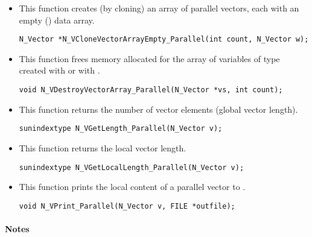 \begin{itemize}

\item {}
 
  This function creates (by cloning) an array of  parallel vectors,
  each with an empty () data array.
 
\begin{verbatim}
N_Vector *N_VCloneVectorArrayEmpty_Parallel(int count, N_Vector w);
\end{verbatim}


\item {}
 
 This function frees memory allocated for the array of   variables of
 type  created with  or with
 .
 

 \verb|void N_VDestroyVectorArray_Parallel(N_Vector *vs, int count);|



\item {}

 This function returns the number of vector elements (global vector length).

 
 
 \verb|sunindextype N_VGetLength_Parallel(N_Vector v);|


\item {}

 This function returns the local vector length.

 
 
 \verb|sunindextype N_VGetLocalLength_Parallel(N_Vector v);|


\item {}
  
  This function prints the local content of a parallel vector to .
 
    
  \verb|void N_VPrint_Parallel(N_Vector v, FILE *outfile);|


\end{itemize}
\paragraph{\bf Notes} 
           
